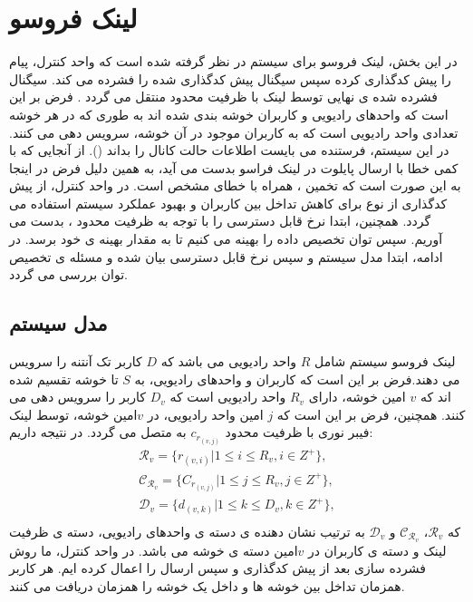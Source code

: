 \section{لینک فروسو}
در این بخش، لینک فروسو برای سیستم  در نظر گرفته شده است که واحد کنترل، پیام را پیش کدگذاری کرده سپس سیگنال پیش کدگذاری شده را فشرده می کند. سیگنال فشرده شده ی نهایی توسط لینک  با ظرفیت محدود منتقل می گردد
\cite{dlsnr}.
\newline
فرض بر این است که واحدهای رادیویی و کاربران خوشه بندی شده اند به طوری که در هر خوشه تعدادی واحد رادیویی است که به کاربران موجود در آن خوشه، سرویس دهی می کنند.\newline
در این سیستم، فرستنده می بایست اطلاعات حالت کانال را بداند
(). 
 از آنجایی که  با کمی خطا با ارسال پایلوت در لینک فراسو بدست می آید، به همین دلیل فرض در اینجا به این صورت است که تخمین ، همراه با خطای مشخص است. در واحد کنترل، از پیش کدگذاری از نوع  برای کاهش تداخل بین کاربران و بهبود عملکرد سیستم استفاده می گردد.\newline
همچنین، ابتدا نرخ قابل دسترسی را با توجه به ظرفیت محدود ، بدست می آوریم. سپس توان تخصیص داده را بهینه می کنیم تا  به مقدار بهینه ی خود برسد.\newline
در ادامه، ابتدا مدل سیستم و سپس نرخ قابل دسترسی بیان شده و مسئله ی تخصیص توان بررسی می گردد\cite{mkm}.
\subsection{مدل سیستم}
لینک فروسو سیستم  شامل $R$  واحد رادیویی می باشد که $D$ کاربر تک آنتنه را سرویس می دهند.فرض بر این است که کاربران و واحدهای رادیویی، به 
 $S$
 تا خوشه تقسیم شده اند که $v$ امین خوشه،
 دارای $R_v$ واحد رادیویی است که ${D}_v$ کاربر را سرویس دهی می کنند\cite{EEcluster}.
 همچنین، فرض بر این است که
$j$
امین واحد رادیویی، در $v$امین خوشه، توسط لینک فیبر نوری با ظرفیت محدود $c_{r_{(v,j)}}$ به  متصل می گردد. در نتیجه داریم:
\begin{equation}
\begin{split}
\mathcal{R}_v= \{  r_{(v,i)} | 1 \leq i \leq {R}_v , i\in Z^+\}, \\
\mathcal{C}_{\mathcal{R}_v}= \{C_{r_{(v,j)}}| 1 \leq j \leq {R}_v , j\in Z^+\}, \\
\mathcal{D}_v= \{  d_{(v,k)} | 1 \leq k \leq {D}_v , k\in Z^+\},  \\
\end{split}
\end{equation} 
که
 $\mathcal{R}_v$، $\mathcal{C}_{\mathcal{R}_v}$
 و
  $\mathcal{D}_v$
 به ترتیب نشان دهنده ی دسته ی واحدهای رادیویی، دسته ی ظرفیت لینک  و دسته ی کاربران در $v$امین دسته ی خوشه می باشد.\newline
در واحد کنترل، ما روش فشرده سازی بعد از پیش کدگذاری و سپس ارسال را اعمال کرده ایم. هر کاربر همزمان تداخل بین خوشه ها و داخل یک خوشه را همزمان دریافت می کنند.
